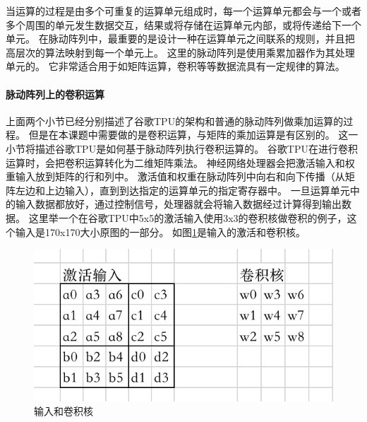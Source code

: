 当运算的过程是由多个可重复的运算单元组成时，每一个运算单元都会与一个或者多个周围的单元发生数据交互，结果或将存储在运算单元内部，或将传递给下一个单元。
在脉动阵列中，最重要的是设计一种在运算单元之间联系的规则，并且把高层次的算法映射到每一个单元上。
这里的脉动阵列是使用乘累加器作为其处理单元的。
它非常适合用于如矩阵运算，卷积等等数据流具有一定规律的算法。  

\paragraph{脉动阵列上的卷积运算}
上面两个小节已经分别描述了谷歌TPU\cite{2017In}的架构和普通的脉动阵列做乘加运算的过程。
但是在本课题中需要做的是卷积运算，与矩阵的乘加运算是有区别的。
这一小节将描述谷歌TPU是如何基于脉动阵列执行卷积运算的。
谷歌TPU\cite{2017In}在进行卷积运算时，会把卷积运算转化为二维矩阵乘法。
神经网络处理器会把激活输入和权重输入放到矩阵的行和列中。
激活值和权重在脉动阵列中向右和向下传播（从矩阵左边和上边输入），直到到达指定的运算单元的指定寄存器中。
一旦运算单元中的输入数据都放好，通过控制信号，处理器就会将输入数据经过计算得到输出数据。
这里举一个在谷歌TPU中5x5的激活输入使用3x3的卷积核做卷积的例子，这个输入是170x170大小原图的一部分\cite{2017Rotating,2016BATCH,0Computing}。
如图\ref{fig:activation_and_kernel}是输入的激活和卷积核。
\begin{figure}[htbp]
    \centering
    \includegraphics[]{figures/activation_and_kernel.png}
    \caption{输入和卷积核}
    \label{fig:activation_and_kernel}
\end{figure} 

